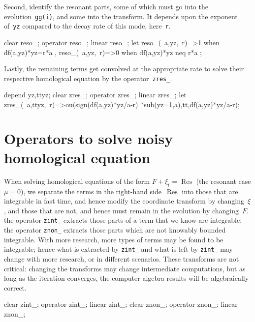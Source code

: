 \documentclass[11pt,a5paper]{article}
\newcommand{\res}{\operatorname{Res}}
\begin{document}
Second, identify the resonant parts, some of which must go
into the evolution~\verb|gg(i)|, and some into the
transform. It depends upon the exponent of~\verb|yz|
compared to the decay rate of this mode, here~\verb|r|.
\begin{reduce}
clear reso_; operator reso_; linear reso_;
let { reso_(~a,yz,~r)=>1 when df(a,yz)*yz=r*a
    , reso_(~a,yz,~r)=>0 when df(a,yz)*yz neq r*a
    };
\end{reduce}

Lastly, the remaining terms get convolved at the appropriate
rate to solve their respective homological equation by the
operator~\verb|zres_|.
\begin{reduce}
depend yz,ttyz;
clear zres_; operator zres_; linear zres_;
let zres_(~a,ttyz,~r)=>ou(sign(df(a,yz)*yz/a-r)
    *sub(yz=1,a),tt,df(a,yz)*yz/a-r);
\end{reduce}




\section{Operators to solve noisy homological equation}

When solving homological equations of the form
$F+\xi_t=\res$ (the resonant case $\mu=0$), we separate the
terms in the right-hand side~$\res$ into those that are
integrable in fast time, and hence modify the coordinate
transform by changing~$\xi$, and those that are not, and
hence must remain in the evolution by changing~$F$.  the
operator \verb|zint_| extracts those parts of a term that we
know are integrable; the operator \verb|znon_| extracts
those parts which are not knowably bounded integrable. With
more research, more types of terms may be found to be
integrable; hence what is extracted by \verb|zint_| and what
is left by \verb|zint_| may change with more research, or in
different scenarios.  These transforms are not critical:
changing the transforms may change intermediate
computations, but as long as the iteration converges, the
computer algebra results will be algebraically correct.
\begin{reduce}
clear zint_; operator zint_; linear zint_;
clear znon_; operator znon_; linear znon_;
\end{reduce}
\end{document}
